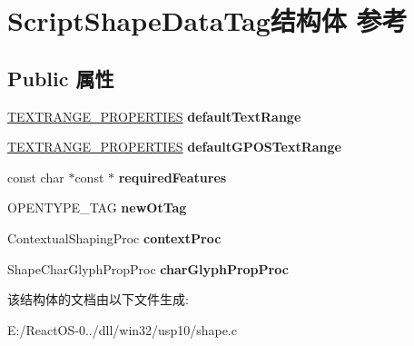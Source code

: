 \hypertarget{struct_script_shape_data_tag}{}\section{Script\+Shape\+Data\+Tag结构体 参考}
\label{struct_script_shape_data_tag}
\subsection*{Public 属性}
\begin{DoxyCompactItemize}
\item 
\mbox{\label{struct_script_shape_data_tag_ac80b932940a9549db906dd212de2ce50}} 
\hyperlink{structtag_t_e_x_t_r_a_n_g_e___p_r_o_p_e_r_t_i_e_s}{T\+E\+X\+T\+R\+A\+N\+G\+E\+\_\+\+P\+R\+O\+P\+E\+R\+T\+I\+ES} {\bfseries default\+Text\+Range}
\item 
\mbox{\label{struct_script_shape_data_tag_a35e1900a6a660b45659060b3be7661c0}} 
\hyperlink{structtag_t_e_x_t_r_a_n_g_e___p_r_o_p_e_r_t_i_e_s}{T\+E\+X\+T\+R\+A\+N\+G\+E\+\_\+\+P\+R\+O\+P\+E\+R\+T\+I\+ES} {\bfseries default\+G\+P\+O\+S\+Text\+Range}
\item 
\mbox{\label{struct_script_shape_data_tag_aaaf77ff594913ba68db873f3416cfbca}} 
const char $\ast$const  $\ast$ {\bfseries required\+Features}
\item 
\mbox{\label{struct_script_shape_data_tag_a365d7c1fb861754eafb3929355bb2f03}} 
O\+P\+E\+N\+T\+Y\+P\+E\+\_\+\+T\+AG {\bfseries new\+Ot\+Tag}
\item 
\mbox{\label{struct_script_shape_data_tag_abc80d9b6124f0927887f8d1a402bdcfa}} 
Contextual\+Shaping\+Proc {\bfseries context\+Proc}
\item 
\mbox{\label{struct_script_shape_data_tag_a5fafdef2fe58fd1d06148f6f2a64b23b}} 
Shape\+Char\+Glyph\+Prop\+Proc {\bfseries char\+Glyph\+Prop\+Proc}
\end{DoxyCompactItemize}


该结构体的文档由以下文件生成\+:\begin{DoxyCompactItemize}
\item 
E\+:/\+React\+O\+S-\/0../dll/win32/usp10/shape.\+c\end{DoxyCompactItemize}
